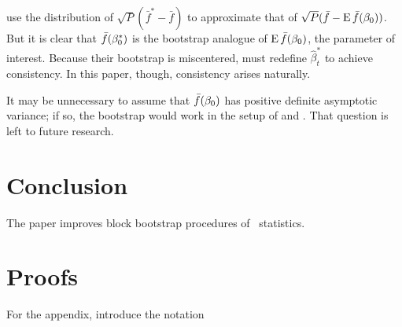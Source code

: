 \documentclass[12pt,fleqn]{article}
\begin{document}
\begin{rem}
  \citet{CoS:07} use the distribution of $\sqrt{P}(\bar{f}^{*} -
  \bar{f})$ to approximate that of $\sqrt{P}(\bar{f} - \operatorname{E}
  \bar{f}(\beta_0))$.  But it is clear that $\bar{f}(\beta_0^*)$
  is the bootstrap analogue of $\operatorname{E} \bar{f}(\beta_0)$, the parameter of
  interest.  Because their bootstrap is miscentered, \citet{CoS:07}
  must redefine $\hat{\beta}_t^{*}$ to achieve consistency.  In this
  paper, though, consistency arises naturally.
\end{rem}

\begin{rem}
  It may be unnecessary to assume that $\bar{f}(\beta_0)$ has positive
  definite asymptotic variance; if so, the bootstrap would work in the
  setup of \citet{ClM:05,ClM:01} and \citet{Mcc:07}.  That question is
  left to future research.
\end{rem}

\section{Conclusion}\label{sec:4}
The paper improves block bootstrap procedures of \oos\
statistics.

\appendix
\section{Proofs}\label{sec:B}

For the appendix, introduce the notation
\end{document}

